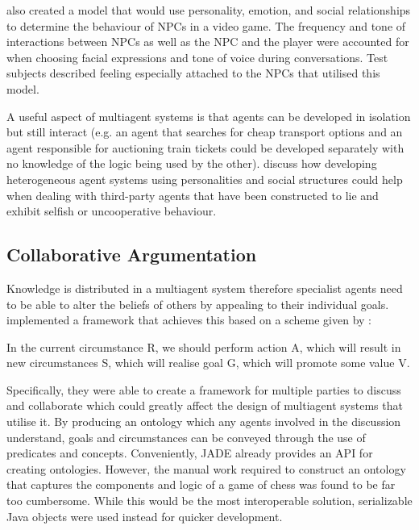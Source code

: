 \documentclass[conference]{IEEEtran}
\begin{document}
\cite{skyrim} also created a model that would use personality, emotion, and social relationships to determine the behaviour of NPCs in a video game. The frequency and tone of interactions between NPCs as well as the NPC and the player were accounted for when choosing facial expressions and tone of voice during conversations. Test subjects described feeling especially attached to the NPCs that utilised this model.

A useful aspect of multiagent systems is that agents can be developed in isolation but still interact (e.g. an agent that searches for cheap transport options and an agent responsible for auctioning train tickets could be developed separately with no knowledge of the logic being used by the other). \cite{hetrogenousagents} discuss how developing heterogeneous agent systems using personalities and social structures could help when dealing with third-party agents that have been constructed to lie and exhibit selfish or uncooperative behaviour.

\subsection{Collaborative Argumentation}

Knowledge is distributed in a multiagent system therefore specialist agents need to be able to alter the beliefs of others by appealing to their individual goals. \cite{argumentation} implemented a framework that achieves this based on a scheme given by \cite{reasoning}:

\begin{displayquote}
	In the current circumstance R, we should perform action A, which will result in new circumstances S, which will realise goal G, which will promote some value V.
\end{displayquote}

Specifically, they were able to create a framework for multiple parties to discuss and collaborate which could greatly affect the design of multiagent systems that utilise it. By producing an ontology which any agents involved in the discussion understand, goals and circumstances can be conveyed through the use of predicates and concepts. Conveniently, JADE already provides an API for creating ontologies. However, the manual work required to construct an ontology that captures the components and logic of a game of chess was found to be far too cumbersome. While this would be the most interoperable solution, serializable Java objects were used instead for quicker development. 
\end{document}
